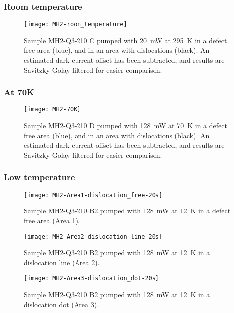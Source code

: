 \subsubsection{Room temperature}

\begin{figure}[H]
\centering
\texttt{[image: MH2-room\_temperature]}
\caption[MH2-Q3-210 at room temperature]{Sample MH2-Q3-210 C pumped with 20~mW at 295~K in a defect free area (blue), and in an area with dislocations (black). An estimated dark current offset has been subtracted, and results are Savitzky-Golay filtered for easier comparison.}
\label{fig:MH2-room_temperature}%
\end{figure}

\subsubsection{At 70K}
\begin{figure}[H]
\centering
\texttt{[image: MH2-70K]}
\caption[MH2-Q3-210 at 70K]{Sample MH2-Q3-210 D pumped with 128~mW at 70~K in a defect free area (blue), and in an area with dislocations (black). An estimated dark current offset has been subtracted, and results are Savitzky-Golay filtered for easier comparison.}
\label{fig:MH2-70K}%
\end{figure}

\subsubsection{Low temperature}

\begin{figure}[H]
\centering
\texttt{[image: MH2-Area1-dislocation\_free-20s]}
\caption[MH2-Q3-210 at area 1]{Sample MH2-Q3-210 B2 pumped with 128~mW at 12~K in a defect free area (Area 1).}
\label{fig:MH2-Area1-dislocation_free-20s}%
\end{figure}

\begin{figure}[H]
\centering
\texttt{[image: MH2-Area2-dislocation\_line-20s]}
\caption[MH2-Q3-210 at area 2]{Sample MH2-Q3-210 B2 pumped with 128~mW at 12~K in a dislocation line (Area 2).}
\label{fig:MH2-Area2-dislocation_line-20s}%
\end{figure}

\begin{figure}[H]
\centering
\texttt{[image: MH2-Area3-dislocation\_dot-20s]}
\caption[MH2-Q3-210 at area 3]{Sample MH2-Q3-210 B2 pumped with 128~mW at 12~K in a dislocation dot (Area 3).}
\label{fig:MH2-Area3-dislocation_dot-20s}%
\end{figure}

